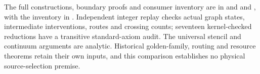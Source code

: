 The full constructions, boundary proofs and consumer inventory are in
 and
 and
, with the inventory in
. Independent integer replay checks
actual graph states, intermediate interventions, routes and crossing counts;
seventeen kernel-checked reductions have a transitive standard-axiom audit.
The universal stencil and continuum arguments are analytic. Historical
golden-family, routing and resource theorems retain their own inputs, and
this comparison establishes no physical source-selection premise.
